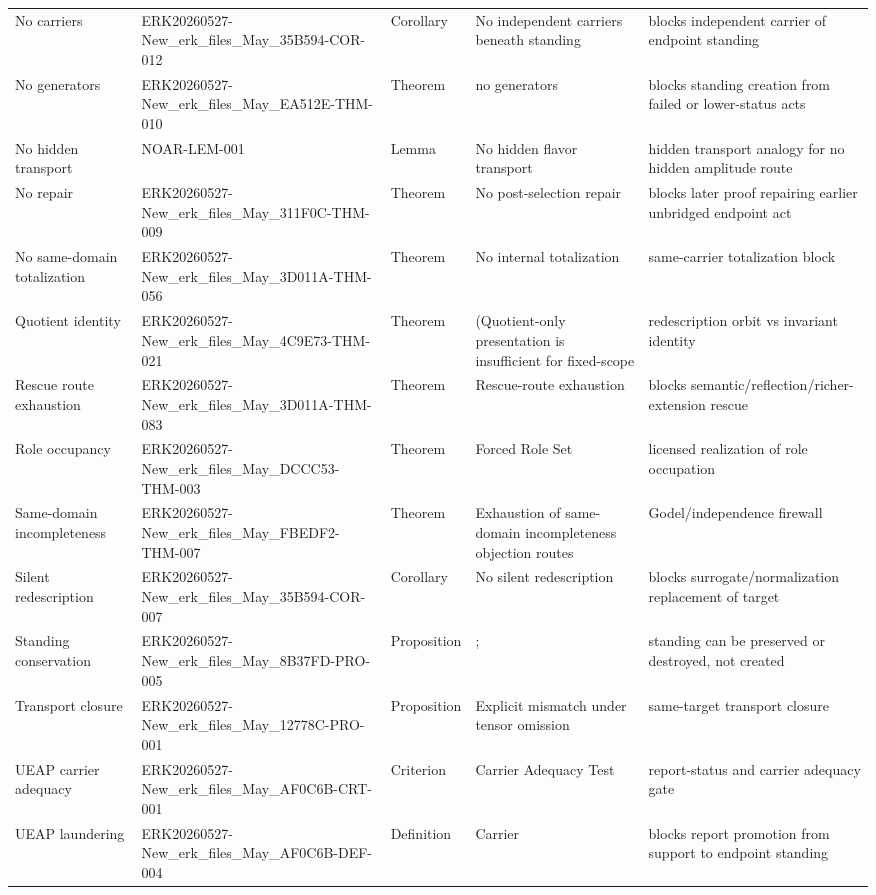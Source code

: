 \begin{longtable}{L{0.16\textwidth} L{0.20\textwidth} L{0.12\textwidth} L{0.21\textwidth} L{0.21\textwidth}}
No carriers & ERK20260527-New\_erk\_files\_May\_35B594-COR-012 & Corollary & No independent carriers beneath standing & blocks independent carrier of endpoint standing \\
No generators & ERK20260527-New\_erk\_files\_May\_EA512E-THM-010 & Theorem & no generators & blocks standing creation from failed or lower-status acts \\
No hidden transport & NOAR-LEM-001 & Lemma & No hidden flavor transport & hidden transport analogy for no hidden amplitude route \\
No repair & ERK20260527-New\_erk\_files\_May\_311F0C-THM-009 & Theorem & No post-selection repair & blocks later proof repairing earlier unbridged endpoint act \\
No same-domain totalization & ERK20260527-New\_erk\_files\_May\_3D011A-THM-056 & Theorem & No internal totalization & same-carrier totalization block \\
Quotient identity & ERK20260527-New\_erk\_files\_May\_4C9E73-THM-021 & Theorem & (Quotient-only presentation is insufficient for fixed-scope & redescription orbit vs invariant identity \\
Rescue route exhaustion & ERK20260527-New\_erk\_files\_May\_3D011A-THM-083 & Theorem & Rescue-route exhaustion & blocks semantic/reflection/richer-extension rescue \\
Role occupancy & ERK20260527-New\_erk\_files\_May\_DCCC53-THM-003 & Theorem & Forced Role Set & licensed realization of role occupation \\
Same-domain incompleteness & ERK20260527-New\_erk\_files\_May\_FBEDF2-THM-007 & Theorem & Exhaustion of same-domain incompleteness objection routes & Godel/independence firewall \\
Silent redescription & ERK20260527-New\_erk\_files\_May\_35B594-COR-007 & Corollary & No silent redescription & blocks surrogate/normalization replacement of target \\
Standing conservation & ERK20260527-New\_erk\_files\_May\_8B37FD-PRO-005 & Proposition & ; & standing can be preserved or destroyed, not created \\
Transport closure & ERK20260527-New\_erk\_files\_May\_12778C-PRO-001 & Proposition & Explicit mismatch under tensor omission & same-target transport closure \\
UEAP carrier adequacy & ERK20260527-New\_erk\_files\_May\_AF0C6B-CRT-001 & Criterion & Carrier Adequacy Test & report-status and carrier adequacy gate \\
UEAP laundering & ERK20260527-New\_erk\_files\_May\_AF0C6B-DEF-004 & Definition & Carrier & blocks report promotion from support to endpoint standing \\
\bottomrule
\end{longtable}
